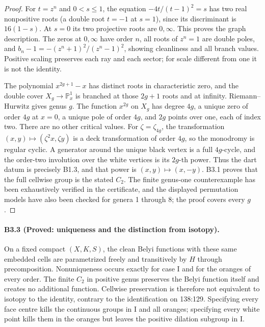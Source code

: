 \begin{proof}
For $t=z^n$ and $0<s\leq1$, the equation
$-4t/(t-1)^2=s$ has two real nonpositive roots (a double root
$t=-1$ at $s=1$), since its discriminant is $16(1-s)$.
At $s=0$ its two projective roots are $0,\infty$.
This proves the graph description. The zeros at $0,\infty$
have order $n$, all roots of $z^n=1$ are double poles, and
$b_n-1=-(z^n+1)^2/(z^n-1)^2$, showing cleanliness and all
branch values. Positive scaling preserves each ray and each sector;
for scale different from one it is not the identity.

The polynomial $x^{2g+1}-x$ has distinct roots in characteristic
zero, and the double cover $X_g\longrightarrow\mathbb P^1_x$ is
branched at those $2g+1$ roots and at infinity. Riemann--Hurwitz
gives genus $g$. The function $x^{2g}$ on $X_g$ has degree $4g$,
a unique zero of order $4g$ at $x=0$, a unique pole of order $4g$,
and $2g$ points over one, each of index two. There are no other
critical values. For $\zeta=\zeta_{4g}$, the transformation
$(x,y)\mapsto(\zeta^2x,\zeta y)$ is a deck transformation of order
$4g$, so the monodromy is regular cyclic. A generator around the
unique black vertex is a full $4g$-cycle, and the order-two
involution over the white vertices is its $2g$-th power. Thus the
dart datum is precisely B1.3, and that power is $(x,y)\mapsto(x,-y)$.
B3.1 proves that the full cellwise group is the stated $C_2$.
The finite genus-one counterexample has been exhaustively verified
in the certificate, and the displayed permutation models have also
been checked for genera 1 through 8; the proof covers every $g$.
\end{proof}

\paragraph{B3.3 (Proved: uniqueness and the distinction from isotopy).}
On a fixed compact $(X,K,S)$, the clean Belyi functions with these
same embedded cells are parametrized freely and transitively by
$H$ through precomposition. Nonuniqueness occurs exactly for case I
and for the oranges of every order. The finite $C_2$ in positive
genus preserves the Belyi function itself and creates no additional
function. Cellwise preservation is therefore not equivalent to
isotopy to the identity, contrary to the identification on 138:129.
Specifying every face centre kills the continuous groups in I and
all oranges; specifying every white point kills them in the oranges
but leaves the positive dilation subgroup in I.

